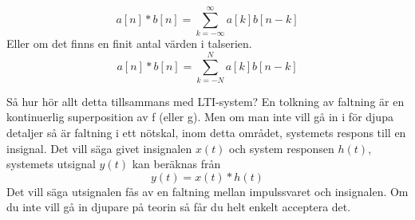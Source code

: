 \documentclass{article}
\begin{document}
$$a[n] * b[n] = \sum_{k=-\infty}^{\infty} a[k] b[n-k]$$
Eller om det finns en finit antal värden i talserien. %
$$a[n] * b[n] = \sum_{k=-N}^{N} a[k] b[n-k]$$





Så hur hör allt detta tillsammans med LTI-system? En tolkning av faltning
är en kontinuerlig superposition av f (eller g). Men om man inte vill gå in
i för djupa detaljer så är faltning i ett nötskal, inom detta området,
systemets respons till en insignal. Det vill säga givet insignalen $x(t)$
och system responsen $h(t)$, systemets utsignal $y(t)$ kan beräknas från
$$y(t) = x(t) * h(t) $$
Det vill säga utsignalen fås av en faltning mellan impulssvaret och insignalen. Om du inte vill gå in djupare på teorin så får du helt enkelt acceptera det.
\\
\end{document}
